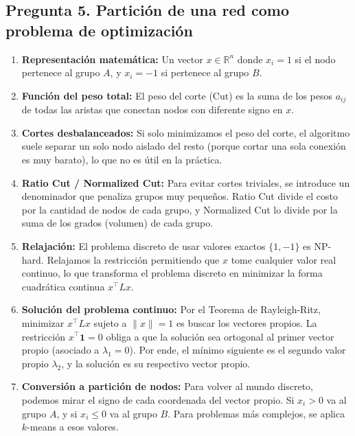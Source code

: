 \documentclass{article}
\begin{document}
	\subsection*{Pregunta 5. Partición de una red como problema de optimización}
	\begin{enumerate}[label=\alph*)]
		\item \textbf{Representación matemática:} Un vector \(x \in \mathbb{R}^n\) donde \(x_i = 1\) si el nodo pertenece al grupo \(A\), y \(x_i = -1\) si pertenece al grupo \(B\).
		
		\item \textbf{Función del peso total:} El peso del corte (\(\text{Cut}\)) es la suma de los pesos \(a_{ij}\) de todas las aristas que conectan nodos con diferente signo en \(x\).
		
		\item \textbf{Cortes desbalanceados:} Si solo minimizamos el peso del corte, el algoritmo suele separar un solo nodo aislado del resto (porque cortar una sola conexión es muy barato), lo que no es útil en la práctica.
		
		\item \textbf{Ratio Cut / Normalized Cut:} Para evitar cortes triviales, se introduce un denominador que penaliza grupos muy pequeños. Ratio Cut divide el costo por la cantidad de nodos de cada grupo, y Normalized Cut lo divide por la suma de los grados (volumen) de cada grupo.
		
		\item \textbf{Relajación:} El problema discreto de usar valores exactos \(\{1, -1\}\) es NP-hard. Relajamos la restricción permitiendo que \(x\) tome cualquier valor real continuo, lo que transforma el problema discreto en minimizar la forma cuadrática continua \(x^\top L x\).
		
		\item \textbf{Solución del problema continuo:} Por el Teorema de Rayleigh-Ritz, minimizar \(x^\top L x\) sujeto a \(\|x\| = 1\) es buscar los vectores propios. La restricción \(x^\top \mathbf{1} = 0\) obliga a que la solución sea ortogonal al primer vector propio (asociado a \(\lambda_1 = 0\)). Por ende, el mínimo siguiente es el segundo valor propio \(\lambda_2\), y la solución es su respectivo vector propio.
		
		\item \textbf{Conversión a partición de nodos:} Para volver al mundo discreto, podemos mirar el signo de cada coordenada del vector propio. Si \(x_i > 0\) va al grupo \(A\), y si \(x_i \le 0\) va al grupo \(B\). Para problemas más complejos, se aplica \(k\)-means a esos valores.
	\end{enumerate}
	
\end{document}
